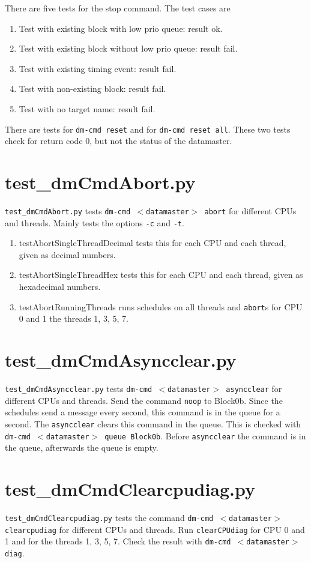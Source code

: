 \documentclass[12pt,a4paper]{report}
\begin{document}
There are five tests for the stop command. The test cases are
\begin{enumerate}
\item Test with existing block with low prio queue: result ok.
\item Test with existing block without low prio queue: result fail.
\item Test with existing timing event: result fail.
\item Test with non-existing block: result fail.
\item Test with no target name: result fail.
\end{enumerate}

There are tests for \texttt{dm-cmd reset} and for \texttt{dm-cmd reset all}. These two tests check for
return code 0, but not the status of the datamaster.

\section{test\_dmCmdAbort.py}
\texttt{test\_dmCmdAbort.py} tests \texttt{dm-cmd $<$datamaster$>$ abort} for different CPUs and threads.
Mainly tests the options \texttt{-c} and \texttt{-t}.
\begin{enumerate}
\item testAbortSingleThreadDecimal tests this for each CPU and each thread, given as decimal numbers.
\item testAbortSingleThreadHex tests this for each CPU and each thread, given as hexadecimal numbers.
\item testAbortRunningThreads runs schedules on all threads and \texttt{abort}s for CPU 0 and 1 the threads 1, 3, 5, 7.
\end{enumerate}

\section{test\_dmCmdAsyncclear.py}
\texttt{test\_dmCmdAsyncclear.py} tests \texttt{dm-cmd $<$datamaster$>$ asyncclear} for different CPUs and threads.
Send the command \texttt{noop} to Block0b. Since the schedules send a message every second, this command is in the queue
for a second. The \texttt{asyncclear} clears this command in the queue. This is
checked with \texttt{dm-cmd $<$datamaster$>$ queue Block0b}. Before
\texttt{asyncclear} the command is in the queue, afterwards the queue is empty.

\section{test\_dmCmdClearcpudiag.py}
\texttt{test\_dmCmdClearcpudiag.py} tests the command \texttt{dm-cmd
$<$datamaster$>$ clearcpudiag} for different CPUs and threads.
Run \texttt{clearCPUdiag} for CPU 0 and 1 and for the threads 1, 3, 5, 7.
Check the result with \texttt{dm-cmd $<$datamaster$>$ diag}.
\end{document}
